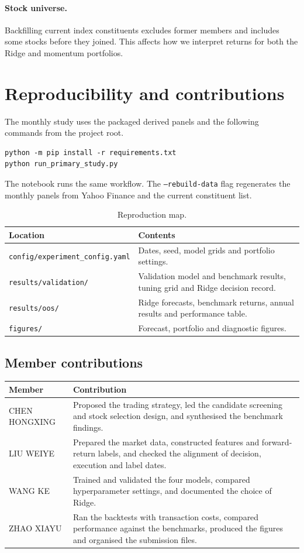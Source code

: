 \documentclass[11pt,a4paper]{article}
\begin{document}
\paragraph{Stock universe.}
Backfilling current index constituents excludes former members and includes some stocks before they joined. This affects how we interpret returns for both the Ridge and momentum portfolios.

\clearpage
\section{Reproducibility and contributions}
\label{sec:repro}
The monthly study uses the packaged derived panels and the following commands from the project root.
\begin{verbatim}
python -m pip install -r requirements.txt
python run_primary_study.py
\end{verbatim}
The notebook runs the same workflow. The \texttt{--rebuild-data} flag regenerates the monthly panels from Yahoo Finance and the current constituent list.

\begin{table}[H]
\centering
\begin{tabular}{lp{7.8cm}}
\toprule
Location & Contents \\
\midrule
\texttt{config/experiment\_config.yaml} & Dates, seed, model grids and portfolio settings. \\
\texttt{results/validation/} & Validation model and benchmark results, tuning grid and Ridge decision record. \\
\texttt{results/oos/} & Ridge forecasts, benchmark returns, annual results and performance table. \\
\texttt{figures/} & Forecast, portfolio and diagnostic figures. \\
\bottomrule
\end{tabular}
\caption{Reproduction map.}
\end{table}

\subsection*{Member contributions}
\begin{tabular}{lp{10.4cm}}
\toprule
Member & Contribution \\
\midrule
CHEN HONGXING & Proposed the trading strategy, led the candidate screening and stock selection design, and synthesised the benchmark findings. \\
LIU WEIYE & Prepared the market data, constructed features and forward-return labels, and checked the alignment of decision, execution and label dates. \\
WANG KE & Trained and validated the four models, compared hyperparameter settings, and documented the choice of Ridge. \\
ZHAO XIAYU & Ran the backtests with transaction costs, compared performance against the benchmarks, produced the figures and organised the submission files. \\
\bottomrule
\end{tabular}
\end{document}
